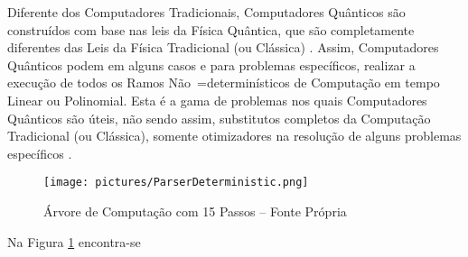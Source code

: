 {    Diferente dos Computadores Tradicionais,
    Computadores Quânticos são construídos com base nas leis da Física Quântica,
    que são completamente diferentes das Leis da Física
    Tradicional (ou Clássica)
    \cite{churchTuringQuantumComputer}.
    Assim,
    Computadores Quânticos podem em alguns casos e
    para problemas específicos,
    realizar a execução de todos os Ramos Não~=determinísticos
    de Computação em tempo Linear ou Polinomial.
    Esta é a gama de problemas nos quais Computadores Quânticos são úteis,
    não sendo assim,
    substitutos completos da Computação Tradicional (ou Clássica),
    somente otimizadores na resolução de alguns problemas
    específicos \cite{theGoodAndBadQuantumComputing}.
    \begin{figure}[H]
    \centering
    \texttt{[image: pictures/ParserDeterministic.png]}
    \caption{Árvore de Computação com 15 Passos -- Fonte Própria}
    \label{fig:pictures/ParserDeterministic.png}
    \end{figure}

    Na Figura \ref{fig:pictures/ParserDeterministic.png} encontra-se
}

